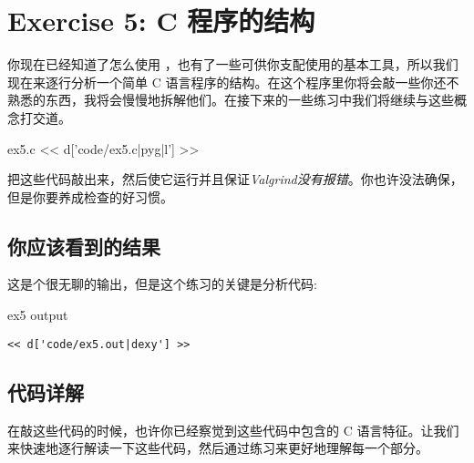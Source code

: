 \chapter{Exercise 5: C 程序的结构}

你现在已经知道了怎么使用  ，也有了一些可供你支配使用的基本工具，所以我们现在来逐行分析一个简单 C 语言程序的结构。在这个程序里你将会敲一些你还不熟悉的东西，我将会慢慢地拆解他们。在接下来的一些练习中我们将继续与这些概念打交道。

\begin{code}{ex5.c}
<< d['code/ex5.c|pyg|l'] >>
\end{code}

把这些代码敲出来，然后使它运行并且保证\emph{Valgrind没有报错}。你也许没法确保，但是你要养成检查的好习惯。

\section{你应该看到的结果}

这是个很无聊的输出，但是这个练习的关键是分析代码:

\begin{code}{ex5 output}
\begin{lstlisting}
<< d['code/ex5.out|dexy'] >>
\end{lstlisting}
\end{code}

\section{代码详解}

在敲这些代码的时候，也许你已经察觉到这些代码中包含的 C 语言特征。让我们来快速地逐行解读一下这些代码，然后通过练习来更好地理解每一个部分。

